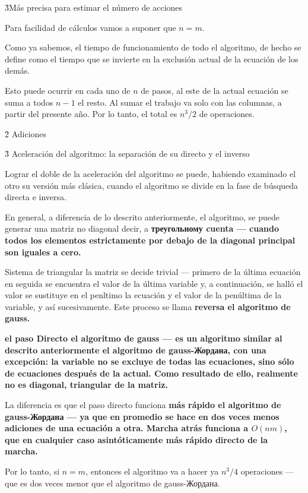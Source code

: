 \h3{Más precisa para estimar el número de acciones}

Para facilidad de cálculos vamos a suponer que $n = m$.

Como ya sabemos, el tiempo de funcionamiento de todo el algoritmo, de hecho se define como el tiempo que se invierte en la exclusión actual de la ecuación de los demás.

Esto puede ocurrir en cada uno de $n$ de pasos, al este de la actual ecuación se suma a todos $n-1$ el resto. Al sumar el trabajo va solo con las columnas, a partir del presente año. Por lo tanto, el total es $n^3 / 2$ de operaciones.




\h2{ Adiciones }


\h3{ Aceleración del algoritmo: la separación de su directo y el inverso }

Lograr el doble de la aceleración del algoritmo se puede, habiendo examinado el otro su versión más clásica, cuando el algoritmo se divide en la fase de búsqueda directa e inversa.

En general, a diferencia de lo descrito anteriormente, el algoritmo, se puede generar una matriz no diagonal decir, a \bf{треугольному cuenta} --- cuando todos los elementos estrictamente por debajo de la diagonal principal son iguales a cero.

Sistema de triangular la matriz se decide trivial --- primero de la última ecuación en seguida se encuentra el valor de la última variable y, a continuación, se halló el valor se sustituye en el penltimo la ecuación y el valor de la penúltima de la variable, y así sucesivamente. Este proceso se llama \bf{reversa} el algoritmo de gauss.

\bf{el paso Directo} el algoritmo de gauss --- es un algoritmo similar al descrito anteriormente el algoritmo de gauss-Жордана, con una excepción: la variable no se excluye de todas las ecuaciones, sino sólo de ecuaciones después de la actual. Como resultado de ello, realmente no es diagonal, triangular de la matriz.

La diferencia es que el paso directo funciona \bf{más rápido} el algoritmo de gauss-Жордана --- ya que en promedio se hace en dos veces menos adiciones de una ecuación a otra. Marcha atrás funciona a $O(nm)$, que en cualquier caso asintóticamente más rápido directo de la marcha.

Por lo tanto, si $n=m$, entonces el algoritmo va a hacer ya $n^3/4$ operaciones --- que es dos veces menor que el algoritmo de gauss-Жордана.


